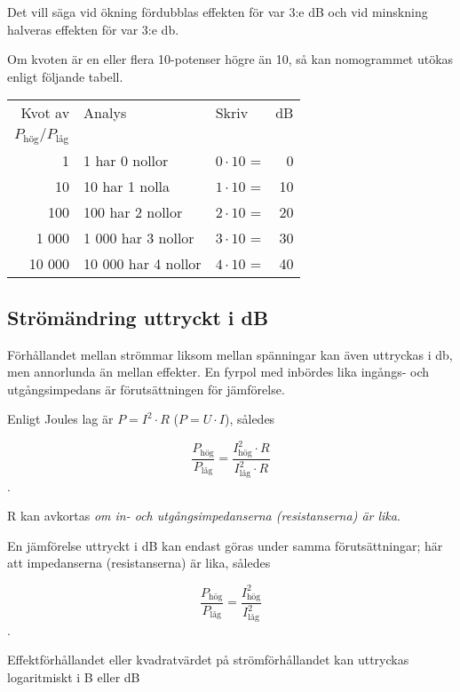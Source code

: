 Det vill säga vid ökning fördubblas effekten för var 3:e dB och vid minskning
halveras effekten för var 3:e \unit{\decibel}.

Om kvoten är en eller flera 10-potenser högre än 10, så kan nomogrammet utökas
enligt följande tabell.

\begin{center}
\begin{tabular}{rllr}
Kvot av & Analys             & Skriv            & dB \\
\(P_{\text{hög}}/P_{\text{låg}}\) &          &                  &    \\
     1 & 1 har 0 nollor      & \(0 \cdot 10\) = &  0 \\
    10 & 10 har 1 nolla      & \(1 \cdot 10\) = & 10 \\
   100 & 100 har 2 nollor    & \(2 \cdot 10\) = & 20 \\
 1 000 &  1 000 har 3 nollor & \(3 \cdot 10\) = & 30 \\
10 000 & 10 000 har 4 nollor & \(4 \cdot 10\) = & 40
\end{tabular}
\end{center}

\subsection{Strömändring uttryckt i dB}

Förhållandet mellan strömmar liksom mellan spänningar kan även uttryckas i
\unit{\decibel}, men annorlunda än mellan effekter.
En fyrpol med inbördes lika ingångs- och utgångsimpedans är förutsättningen för
jämförelse.

Enligt Joules lag är \(P = I^2 \cdot R\) (\(P = U \cdot I\)), således

\[\dfrac{P_{\text{hög}}}{P_{\text{låg}}} = \dfrac{I_{\text{hög}}^2 \cdot R}{I_{\text{låg}}^2 \cdot R}\].

R kan avkortas \emph{om in- och utgångsimpedanserna (resistanserna) är lika}.

En jämförelse uttryckt i dB kan endast göras under samma förutsättningar;
här att impedanserna (resistanserna) är lika, således

\[\dfrac{P_{\text{hög}}}{P_{\text{låg}}} = \dfrac{I_{\text{hög}}^2}{I_{\text{låg}}^2}\].

Effektförhållandet eller kvadratvärdet på strömförhållandet kan uttryckas
logaritmiskt i B eller dB

